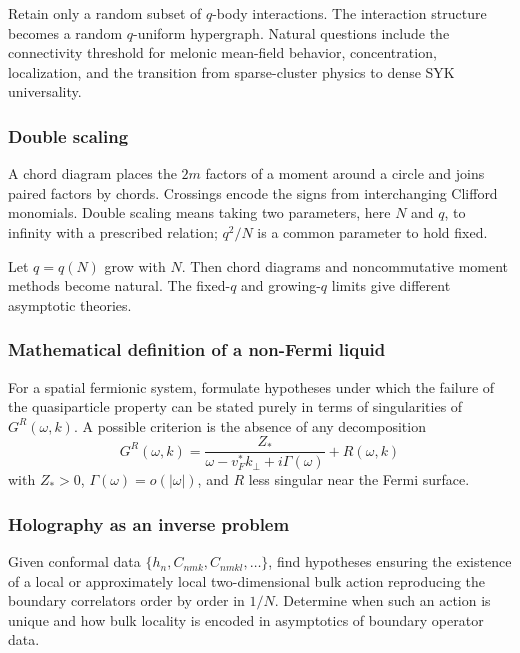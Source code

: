 \documentclass[11pt]{article}
\numberwithin{equation}{section}
\theoremstyle{exposition}
\theoremstyle{result}
\begin{document}
Retain only a random subset of $q$-body interactions. The interaction structure becomes a random $q$-uniform hypergraph. Natural questions include the connectivity threshold for melonic mean-field behavior, concentration, localization, and the transition from sparse-cluster physics to dense SYK universality.

\subsubsection{Double scaling}

A chord diagram places the $2m$ factors of a moment around a circle and joins paired factors by chords. Crossings encode the signs from interchanging Clifford monomials. Double scaling means taking two parameters, here $N$ and $q$, to infinity with a prescribed relation; $q^2/N$ is a common parameter to hold fixed.

Let $q=q(N)$ grow with $N$. Then chord diagrams and noncommutative moment methods become natural. The fixed-$q$ and growing-$q$ limits give different asymptotic theories.

\subsubsection{Mathematical definition of a non-Fermi liquid}

For a spatial fermionic system, formulate hypotheses under which the failure of the quasiparticle property can be stated purely in terms of singularities of $G^R(\omega,k)$. A possible criterion is the absence of any decomposition
\begin{equation*}
G^R(\omega,k)
=\frac{Z_*}{\omega-v_F^*k_\perp+i\Gamma(\omega)}+R(\omega,k)
\end{equation*}
with $Z_*>0$, $\Gamma(\omega)=o(|\omega|)$, and $R$ less singular near the Fermi surface.

\subsubsection{Holography as an inverse problem}

Given conformal data $\{h_n,C_{nmk},C_{nmkl},\ldots\}$, find hypotheses ensuring the existence of a local or approximately local two-dimensional bulk action reproducing the boundary correlators order by order in $1/N$. Determine when such an action is unique and how bulk locality is encoded in asymptotics of boundary operator data.

\appendix
\end{document}
